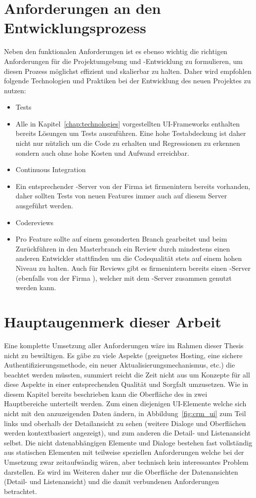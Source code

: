 \section{Anforderungen an den Entwicklungsprozess}
Neben den funktionalen Anforderungen ist es ebenso wichtig die richtigen Anforderungen für die Projektumgebung und -Entwicklung zu formulieren, um diesen Prozess möglichst effizient und skalierbar zu halten. Daher wird empfohlen folgende Technologien und Praktiken bei der Entwicklung des neuen Projektes zu nutzen:
\begin{itemize}
    \item{Tests}
    \item[] Alle in Kapitel~\ref{chap:technologies} vorgestellten UI-Frameworks enthalten bereits Lösungen um Tests auszuführen. Eine hohe Testabdeckung ist daher nicht nur nützlich um die Code zu erhalten und Regressionen zu erkennen sondern auch ohne hohe Kosten und Aufwand erreichbar.
    \item{Continuous Integration}
    \item[] Ein entsprechender -Server von der Firma  ist firmenintern bereits vorhanden, daher sollten Tests von neuen Features immer auch auf diesem Server ausgeführt werden.
    \item{Codereviews}
    \item[] Pro Feature sollte auf einem gesonderten Branch gearbeitet und beim Zurückführen in den Masterbranch ein Review durch mindestens einen anderen Entwickler stattfinden um die Codequalität stets auf einem hohen Niveau zu halten. Auch für Reviews gibt es firmenintern bereits einen -Server (ebenfalls von der Firma ), welcher mit dem -Server zusammen genutzt werden kann.
\end{itemize}

\section{Hauptaugenmerk dieser Arbeit}
Eine komplette Umsetzung aller Anforderungen wäre im Rahmen dieser Thesis nicht zu bewältigen. Es gäbe zu viele Aspekte (geeignetes Hosting, eine sichere Authentifizierungsmethode, ein neuer Aktualisierungsmechanismus, etc.) die beachtet werden müssten, summiert reicht die Zeit nicht aus um Konzepte für all diese Aspekte in einer entsprechenden Qualität und Sorgfalt umzusetzen. 
Wie in diesem Kapitel bereits beschrieben kann die Oberfläche des  in zwei Hauptbereiche unterteilt werden. Zum einen diejenigen UI-Elemente welche sich nicht mit den anzuzeigenden Daten ändern, in Abbildung~\ref{fig:crm_ui} zum Teil links und oberhalb der Detailansicht zu sehen (weitere Dialoge und Oberflächen werden kontextbasiert angezeigt), und zum anderen die Detail- und Listenansicht selbst. Die nicht datenabhängigen Elemente und Dialoge bestehen fast vollständig aus statischen Elementen mit teilweise speziellen Anforderungen welche bei der Umsetzung zwar zeitaufwändig wären, aber technisch kein interessantes Problem darstellen. Es wird im Weiteren daher nur die Oberfläche der Datenansichten (Detail- und Listenansicht) und die damit verbundenen Anforderungen betrachtet. 

